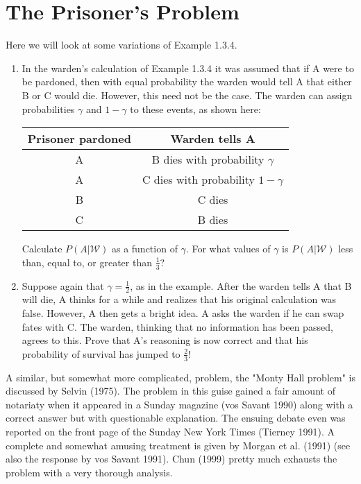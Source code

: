 \section{The Prisoner's Problem}

\begin{problembox}
Here we will look at some variations of Example 1.3.4.
\begin{enumerate}[label=(\alph*)]
    \item In the warden's calculation of Example 1.3.4 it was assumed that if A were to be pardoned, then with equal probability the warden would tell A that either B or C would die. However, this need not be the case. The warden can assign probabilities $\gamma$ and $1-\gamma$ to these events, as shown here:
    
    \begin{tabular}{|c|c|}
    \hline
    Prisoner pardoned & Warden tells A \\
    \hline
    A & B dies with probability $\gamma$ \\
    A & C dies with probability $1-\gamma$ \\
    B & C dies \\
    C & B dies \\
    \hline
    \end{tabular}
    
    Calculate $P(A|\mathcal{W})$ as a function of $\gamma$. For what values of $\gamma$ is $P(A|\mathcal{W})$ less than, equal to, or greater than $\frac{1}{3}$?
    
    \item Suppose again that $\gamma=\frac{1}{2}$, as in the example. After the warden tells A that B will die, A thinks for a while and realizes that his original calculation was false. However, A then gets a bright idea. A asks the warden if he can swap fates with C. The warden, thinking that no information has been passed, agrees to this. Prove that A's reasoning is now correct and that his probability of survival has jumped to $\frac{2}{3}$!
\end{enumerate}
A similar, but somewhat more complicated, problem, the "Monty Hall problem" is discussed by Selvin (1975). The problem in this guise gained a fair amount of notariaty when it appeared in a Sunday magazine (vos Savant 1990) along with a correct answer but with questionable explanation. The ensuing debate even was reported on the front page of the Sunday New York Times (Tierney 1991). A complete and somewhat amusing treatment is given by Morgan et al. (1991) (see also the response by vos Savant 1991). Chun (1999) pretty much exhausts the problem with a very thorough analysis.
\end{problembox}

